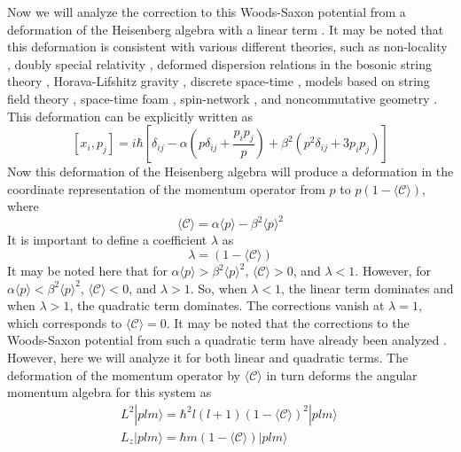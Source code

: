 \documentclass[12pt]{article}
\begin{document}
 Now we  will analyze the  correction to this  Woods-Saxon potential from a deformation of the Heisenberg algebra with a linear term   \cite{line12, line14, bb1,bb2,bb3,bb4,bb5,bb6,bb7,line16, line18}. It may be noted that this deformation is consistent with various  different theories, such as non-locality \cite{nonl}, doubly special relativity \cite{dsr}, deformed 
dispersion relations in the bosonic string theory \cite{stri}, Horava-Lifshitz gravity \cite{HoravaPRD, HoravaPRL}, discrete space-time \cite{Hooft}, models based on string field theory \cite{Samuel1}, space-time foam \cite{Ellis}, spin-network \cite{Gambini}, and noncommutative geometry \cite{Carroll}. 
This deformation can be explicitly written as  
 \cite{line12, line14, bb1,bb2,bb3,bb4,bb5,bb6,bb7, line16, line18}
\begin{equation} \label{commutation}
	[x_i, p_j] = i\hbar \left[\delta_{ij} -\alpha \left( p\delta_{ij} + \frac{p_ip_j}{p}\right)  + \beta^2\left(p^2 \delta_{ij} + 3 p_ip_j\right)        \right]
\end{equation}      
Now  this deformation of the Heisenberg  algebra will produce  a deformation in the coordinate representation of the momentum operator from $p$ to $p \left(1 - \langle\mathcal{C}\rangle\right)$, where  
\begin{equation}
	\langle\mathcal{C}\rangle = \alpha \langle p\rangle - \beta^2 \langle p\rangle^2
\end{equation}
It is important to define a coefficient   $\lambda$ as 
\begin{equation}
  \lambda  = \left(1 - \langle\mathcal{C}\rangle\right)
\end{equation} 
It may be noted here that for $\alpha \langle p\rangle > \beta^2 \langle p\rangle^2 $, $	\langle\mathcal{C}\rangle  > 0$, and $\lambda < 1$.  However,  for $\alpha \langle p\rangle < \beta^2 \langle p\rangle^2 $, $	\langle\mathcal{C}\rangle  <  0$, and $\lambda >1 $. So,  when  $\lambda<1$,  the linear term dominates and when  $\lambda >1$, the quadratic term dominates. The corrections vanish at $\lambda = 1$, which corresponds to $	\langle\mathcal{C}\rangle =0$.  It may be noted that the corrections to the Woods-Saxon potential from  such a  quadratic term have already been analyzed \cite{dwood, dwood1, dwood2, dwood4, dwood5}.  However, here we will analyze it for both linear and quadratic terms. The deformation of the  momentum operator by  $\langle\mathcal{C}\rangle$  in turn deforms the angular momentum algebra for this system  as \cite{an12, an14}
\begin{align}
L^2 |plm\rangle = \hbar^2 l(l+1) \left(1 - \langle\mathcal{C}\rangle\right)^2 |plm\rangle ~ \label{ang_mom1}
\\
L_z |plm\rangle = \hbar m \left(1 - \langle\mathcal{C}\rangle\right) |plm\rangle ~\label{ang_mom2}
\end{align} 
\end{document}
